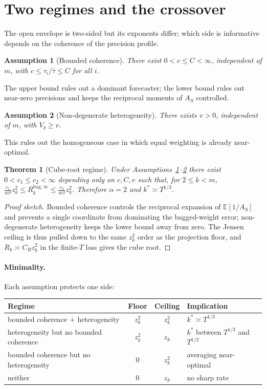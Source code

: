 \documentclass[11pt]{article}
\newcommand{\E}{\mathbb{E}}
\newcommand{\Rbag}{R_k^{\mathrm{bag},\infty}}
\newtheorem{assumption}{Assumption}
\newtheorem{theorem}{Theorem}
\begin{document}
\section{Two regimes and the crossover}
The open envelope is two-sided but its exponents differ; which side is informative depends on
the coherence of the precision profile.

\begin{assumption}[Bounded coherence]\label{ass:A}
There exist $0<c\le C<\infty$, independent of $m$, with $c\le\tau_i/\bar\tau\le C$ for all $i$.
\end{assumption}
\noindent The upper bound rules out a dominant forecaster; the lower bound rules out near-zero
precisions and keeps the reciprocal moments of $A_S$ controlled.

\begin{assumption}[Non-degenerate heterogeneity]\label{ass:B}
There exists $v>0$, independent of $m$, with $V_\delta\ge v$.
\end{assumption}
\noindent This rules out the homogeneous case in which equal weighting is already near-optimal.

\begin{theorem}[Cube-root regime]
Under Assumptions~\ref{ass:A}--\ref{ass:B} there exist $0<c_1\le c_2<\infty$ depending only on
$c,C,v$ such that, for $2\le k<m$, $\frac{c_1}{m\bar\tau}z_k^2\le\Rbag\le\frac{c_2}{m\bar\tau}
z_k^2$. Therefore $\alpha=2$ and $k^\ast\asymp T^{1/3}$.
\end{theorem}
\begin{proof}[Proof sketch]
Bounded coherence controls the reciprocal expansion of $\E[1/A_S]$ and prevents a single
coordinate from dominating the bagged-weight error; non-degenerate heterogeneity keeps the
lower bound away from zero. The Jensen ceiling is thus pulled down to the same $z_k^2$ order as
the projection floor, and $R_k\asymp C_Rz_k^2$ in the finite-$T$ loss gives the cube root.
\end{proof}

\paragraph{Minimality.} Each assumption protects one side:
\begin{center}
\begin{tabular}{lccl}
\hline
Regime & Floor & Ceiling & Implication \\
\hline
bounded coherence $+$ heterogeneity & $z_k^2$ & $z_k^2$ & $k^\ast\asymp T^{1/3}$ \\
heterogeneity but no bounded coherence & $z_k^2$ & $z_k$ & $k^\ast$ between $T^{1/3}$ and $T^{1/2}$ \\
bounded coherence but no heterogeneity & $0$ & $z_k^2$ & averaging near-optimal \\
neither & $0$ & $z_k$ & no sharp rate \\
\hline
\end{tabular}
\end{center}
\end{document}
